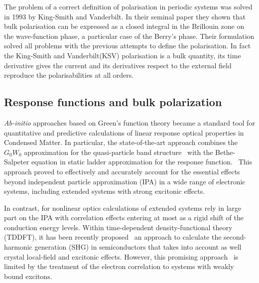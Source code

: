 The problem of a correct definition of polarisation in periodic systems was solved in 1993 by  King-Smith and Vanderbilt.\cite{KSV1} In their seminal paper they shown that  bulk polarisation can be expressed as a closed integral in the Brillouin zone on the wave-function phase, a particular case of the Berry's phase. Their formulation solved all problems with the previous attempts to define the polarisation. In fact the King-Smith and Vanderbilt(KSV) polarisation is a bulk quantity, its time derivative gives the current and its derivatives respect to the external field reproduce the polarisabilities at all orders.
\subsection{Response functions and bulk polarization}
\emph{Ab-initio} approaches based on Green's function theory became a standard tool for quantitative and predictive calculations of linear response optical properties in Condensed Matter. In particular, the state-of-the-art approach combines the $G_0W_0$ approximation for the quasi-particle band structure~\cite{aryasetiawan1998gw} with the Bethe-Salpeter equation in static ladder approximation for the response function.~\cite{strinati} This approach proved to effectively and accurately account for the essential effects beyond independent particle approximation (IPA) in a wide range of electronic systems, including extended systems with strong excitonic effects.~\cite{Onida}

In contrast, for nonlinear optics \ai calculations of extended systems rely in large part on the IPA\cite{PhysRevB.48.11705} with correlation effects entering at most as a rigid shift of the conduction energy levels\cite{PhysRevB.80.155205}.  Within time-dependent density-functional theory (TDDFT), it has been recently proposed~\cite{PhysRevB.82.235201} an approach to calculate the second-harmonic generation (SHG) in semiconductors that takes into account as well crystal local-field and excitonic effects. However, this promising approach~\cite{Cazzanelli2012} is limited by the treatment of the electron correlation to systems with weakly bound excitons.~\cite{LRC} 

